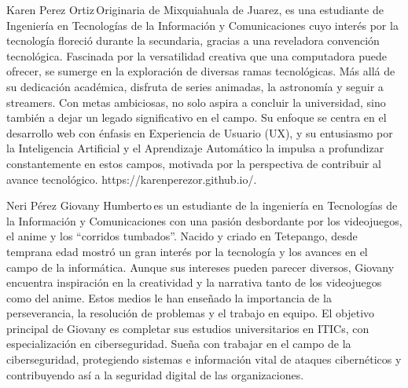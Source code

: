 \documentclass{IEEEcsmag}
\begin{document}
\begin{IEEEbiography}{Karen Perez Ortiz}{\,}Originaria de Mixquiahuala de Juarez, es una estudiante de Ingeniería en Tecnologías de la Información y Comunicaciones cuyo interés por la tecnología floreció durante la secundaria, gracias a una reveladora convención tecnológica. Fascinada por la versatilidad creativa que una computadora puede ofrecer, se sumerge en la exploración de diversas ramas tecnológicas. Más allá de su dedicación académica, disfruta de series animadas, la astronomía y seguir a streamers. Con metas ambiciosas, no solo aspira a concluir la universidad, sino también a dejar un legado significativo en el campo. Su enfoque se centra en el desarrollo web con énfasis en Experiencia de Usuario (UX), y su entusiasmo por la Inteligencia Artificial y el Aprendizaje Automático la impulsa a profundizar constantemente en estos campos, motivada por la perspectiva de contribuir al avance tecnológico. https://karenperezor.github.io/.
\end{IEEEbiography}
\begin{IEEEbiography}{Neri Pérez Giovany Humberto}{\,}es un estudiante de la ingeniería en Tecnologías de la Información y Comunicaciones con una pasión desbordante por los videojuegos, el anime y los ``corridos tumbados''. Nacido y criado en  Tetepango, desde temprana edad mostró un gran interés por la tecnología y los avances en el campo de la informática. Aunque sus intereses pueden parecer diversos, Giovany encuentra inspiración en la creatividad y la narrativa tanto de los videojuegos como del anime. Estos medios le han enseñado la importancia de la perseverancia, la resolución de problemas y el trabajo en equipo. El objetivo principal de Giovany es completar sus estudios universitarios en ITICs, con especialización en ciberseguridad. Sueña con trabajar en el campo de la ciberseguridad, protegiendo sistemas e información vital de ataques cibernéticos y contribuyendo así a la seguridad digital de las organizaciones.
\end{IEEEbiography}
\end{document}
